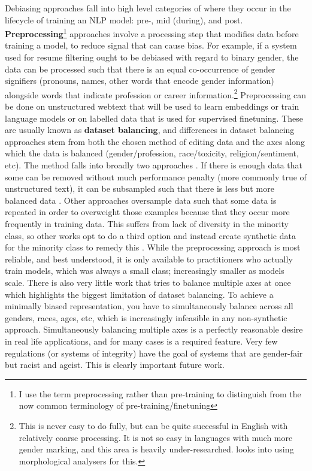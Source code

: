 Debiasing approaches fall into high level categories of where they occur in the lifecycle of training an NLP model: pre-, mid (during), and post. \textbf{Preprocessing}\footnote{I use the term preprocessing rather than pre-training to distinguish from the now common terminology of pre-training/finetuning} approaches involve a processing step that modifies data before training a model, to reduce signal that can cause bias. For example, if a system used for resume filtering ought to be debiased with regard to binary gender, the data can be processed such that there is an equal co-occurrence of gender signifiers (pronouns, names, other words that encode gender information) alongside words that indicate profession or career information.\footnote{This is never easy to do fully, but can be quite successful in English with relatively coarse processing. It is not so easy in languages with much more gender marking, and this area is heavily under-researched. \citet{gonen-etal-2019-grammatical} looks into using morphological analysers for this.}
Preprocessing can be done on unstructured webtext that will be used to learn embeddings or train language models or on labelled data that is used for supervised finetuning. These are usually known as \textbf{dataset balancing}, and differences in dataset balancing approaches stem from both the chosen method of editing data and the axes along which the data is balanced (gender/profession, race/toxicity, religion/sentiment, etc). The method falls into broadly two approaches \citep{schwartz-stanovsky-2022-limitations}. If there is enough data that some can be removed without much performance penalty (more commonly true of unstructured text), it can be subsampled such that there is less but more balanced data \citep{wang2019balanced}. Other approaches oversample data such that some data is repeated \citep{chawla2002smote} in order to overweight those examples because that they occur more frequently in training data. This suffers from lack of diversity in the minority class, so other works opt to do a third option and instead create synthetic data for the minority class to remedy this \citep{Dixon2018MeasuringAM, zhao-etal-2018-gender}. While the preprocessing approach is most reliable, and best understood, it is only available to practitioners who actually train models, which was always a small class; increasingly smaller as models scale. There is also very little work that tries to balance multiple axes at once which highlights the biggest limitation of dataset balancing. To achieve a minimally biased representation, you have to simultaneously balance across all genders, races, ages, etc, which is increasingly infeasible in any non-synthetic approach. 
Simultaneously balancing multiple axes is a perfectly reasonable desire in real life applications, and for many cases is a required feature. Very few regulations (or systems of integrity) have the goal of systems that are gender-fair but racist and ageist. This is clearly important future work.

